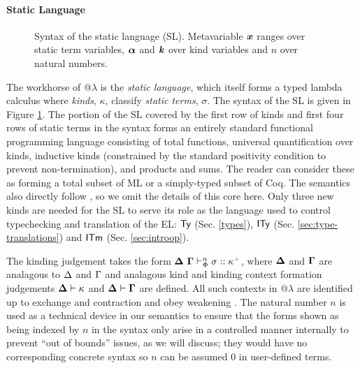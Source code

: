 \documentclass[10pt,preprint]{sigplanconf}
\newcommand{\moutput}{^{\color{gray}+}}
\begin{document}
\paragraph{Static Language}
\begin{figure}[t]
\small
\hspace{-5px}
\caption{Syntax of the static language (SL). Metavariable ${\textbf{\textit{x}}}$ ranges over static term variables, $\boldsymbol{\alpha}$ and $\textbf{\textit{k}}$ over kind variables and $n$ over natural numbers.}\vspace{-5px}
\label{syntax-SL}
\end{figure}
The workhorse of @$\lambda$ is the \emph{static language}, which itself forms a typed lambda calculus where 
\emph{kinds}, $\kappa$, classify \emph{static terms}, $\sigma$.  The syntax of the SL is given in Figure \ref{syntax-SL}. The portion of the SL covered by the first row of kinds and first four rows of static terms in the syntax forms an entirely standard  functional programming language consisting of total functions, universal quantification over kinds, inductive kinds (constrained by the standard positivity condition to prevent non-termination), and products and sums. The reader can consider these as forming a total subset of ML or a simply-typed subset of Coq. The semantics also directly follow \cite{pfpl}, so we  omit the details of this core here.  Only three new  kinds are needed for the SL to serve its role as the language used to   control typechecking and translation of the EL: ${\sf Ty}$ (Sec. \ref{types}), ${\sf ITy}$ (Sec. \ref{sec:type-translations}) and ${\sf ITm}$ (Sec. \ref{sec:introop}). 

The kinding judgement takes the form $\sofkX{\st}{\kappa\moutput}$, where $\boldsymbol\Delta$ and $\boldsymbol\Gamma$ are analagous to $\Delta$ and $\Gamma$ and analagous kind and kinding context formation judgements $\boldsymbol\Delta \vdash \kappa$ and $\boldsymbol\Delta \vdash \boldsymbol\Gamma$ are  defined. All such contexts in @$\lambda$ are identified up to exchange and contraction and obey weakening \cite{pfpl}. The natural number $n$ is used as a technical device in our semantics to ensure that the forms shown as being indexed by $n$ in the syntax only arise in a controlled manner internally to prevent ``out of bounds'' issues, as we will discuss; they would have no corresponding concrete syntax so $n$ can be assumed $0$ in user-defined terms. 
\end{document}
